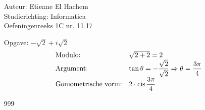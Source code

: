 \documentclass[a4paper]{article}
\begin{document}
  
\noindent \large Auteur: Etienne El Hachem \\
\noindent \large Studierichting: Informatica\\
\noindent \large Oefeningenreeks 1C nr. 11.17\\

\medskip

\normalsize

Opgave: $-\sqrt{2} + i\sqrt{2}$\\

\[
\begin{array}{l l}
\text{Modulo:}   & \sqrt{2+2} = 2 \\
\text{Argument:} & \tan \theta = -\dfrac{\sqrt{2}}{\sqrt{2}} \Rightarrow \theta = \dfrac{3\pi}{4}\\
\text{Goniometrische vorm:} & 2 \cdot \operatorname{cis} \dfrac{3\pi}{4}
\end{array}
\]


\begin{thebibliography}{999}
\end{thebibliography}
\end{document}
